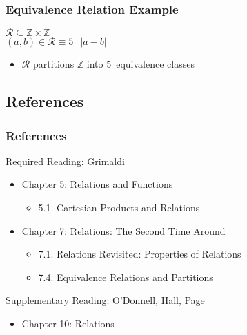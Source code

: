\documentclass[dvipsnames]{beamer}
\begin{document}
\begin{frame}
  \frametitle{Equivalence Relation Example}

  \begin{example}
    $\mathcal{R} \subseteq \mathbb{Z} \times \mathbb{Z}$\\
    $(a,b) \in \mathcal{R} \equiv 5~|~|a - b|$

    \bigskip
    \begin{itemize}
      \item $\mathcal{R}$ partitions $\mathbb{Z}$ into 5~equivalence classes
    \end{itemize}
  \end{example}
\end{frame}

\subsection*{References}

\begin{frame}
  \frametitle{References}

  \begin{block}{Required Reading: Grimaldi}
    \begin{itemize}
      \item Chapter 5: Relations and Functions
      \begin{itemize}
        \item 5.1. \alert{Cartesian Products and Relations}
      \end{itemize}
      \item Chapter 7: Relations: The Second Time Around
      \begin{itemize}
        \item 7.1. \alert{Relations Revisited: Properties of Relations}
        \item 7.4. \alert{Equivalence Relations and Partitions}
      \end{itemize}
    \end{itemize}
  \end{block}

  \begin{block}{Supplementary Reading: O'Donnell, Hall, Page}
    \begin{itemize}
      \item Chapter 10: Relations
    \end{itemize}
  \end{block}
\end{frame}
\end{document}
